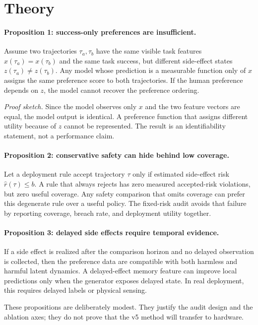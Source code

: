 \documentclass{article}
\begin{document}
\section{Theory}
\paragraph{Proposition 1: success-only preferences are insufficient.}
Assume two trajectories $\tau_a,\tau_b$ have the same visible task features $x(\tau_a)=x(\tau_b)$ and the same task success, but different side-effect states $z(\tau_a)\neq z(\tau_b)$. Any model whose prediction is a measurable function only of $x$ assigns the same preference score to both trajectories. If the human preference depends on $z$, the model cannot recover the preference ordering.

\emph{Proof sketch.} Since the model observes only $x$ and the two feature vectors are equal, the model output is identical. A preference function that assigns different utility because of $z$ cannot be represented. The result is an identifiability statement, not a performance claim.

\paragraph{Proposition 2: conservative safety can hide behind low coverage.}
Let a deployment rule accept trajectory $\tau$ only if estimated side-effect risk $\hat r(\tau)\leq b$. A rule that always rejects has zero measured accepted-risk violations, but zero useful coverage. Any safety comparison that omits coverage can prefer this degenerate rule over a useful policy. The fixed-risk audit avoids that failure by reporting coverage, breach rate, and deployment utility together.

\paragraph{Proposition 3: delayed side effects require temporal evidence.}
If a side effect is realized after the comparison horizon and no delayed observation is collected, then the preference data are compatible with both harmless and harmful latent dynamics. A delayed-effect memory feature can improve local predictions only when the generator exposes delayed state. In real deployment, this requires delayed labels or physical sensing.

These propositions are deliberately modest. They justify the audit design and the ablation axes; they do not prove that the v5 method will transfer to hardware.
\end{document}

